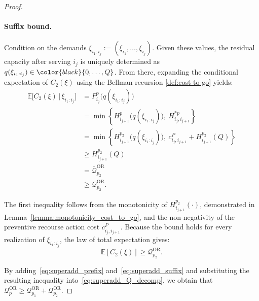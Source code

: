 \documentclass{article}
\newcommand{\rev}[1]{{\color{black}#1}}
\begin{document}
\begin{proof}
\paragraph{Suffix bound.}
Condition on the demands $\xi_{i_1:i_j}:=(\xi_{i_1},\dots,\xi_{i_j})$.  
Given these values, the residual capacity after serving $i_j$ is uniquely determined as $q(\xi_{i_1:i_j})\in \rev{\{0,\dots,Q\}}$. From there, expanding the conditional expectation of $C_2(\xi)$ using the Bellman recursion \eqref{def:cost-to-go} yields:
\begingroup
\allowdisplaybreaks
\begin{align*}
    \mathbb E\bigl[C_2(\xi)
                 \,\bigl\lvert\,
                 \xi_{i_1:i_j}\bigr] &= F^{p}_{i_j}\bigl(q(\xi_{i_1:i_j})\bigr)\\
    &= \min\left\{ H^p_{i_{j+1}}\bigl(q(\xi_{i_1:i_j})\bigr), \ H^{*p}_{i_j,i_{j+1}} \right\} \\
    &= \min\left\{ H^{p_2}_{i_{j+1}}\bigl(q(\xi_{i_1:i_j})\bigr), \  c^P_{i_j, i_{j+1}}+ H^{p_2}_{i_{j+1}}(Q) \right\} \\
    &\geq H^{p_2}_{i_{j+1}}(Q)\\
    &= \bar{\mathcal{Q}}^{\text{OR}}_{p_2}\\
    &\geq \mathcal{Q}^{\text{OR}}_{p_2}.
\end{align*}
\endgroup

The first inequality follows from the monotonicity of $H^{p_2}_{i_{j+1}}(\cdot)$, demonstrated in Lemma~\ref{lemma:monotonicity_cost_to_go}, and the non-negativity of the preventive recourse action cost $c^{P}_{i_j,i_{j+1}}$.
Because the bound holds for every realization of $\xi_{i_1:i_j}$, the \rev{law of total expectation} gives:
\begin{equation}\label{eq:superadd_suffix}
  \mathbb E[C_2(\xi)] \geq \mathcal{Q}^{\text{OR}}_{p_2}.
\end{equation}

By adding~\eqref{eq:superadd_prefix} and~\eqref{eq:superadd_suffix} and substituting the resulting inequality into~\eqref{eq:superadd_Q_decomp}, we obtain that $\mathcal{Q}^{\text{OR}}_{p} \geq \mathcal{Q}^{\text{OR}}_{p_1} + \mathcal{Q}^{\text{OR}}_{p_2}$.
\end{proof}

\end{document}
